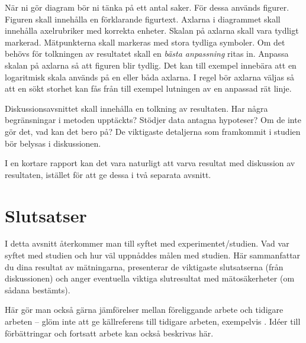 \documentclass[a4paper,nologo]{miunart} %
\begin{document}
När ni gör diagram bör ni tänka på ett antal saker.
För dessa används figurer.
Figuren skall innehålla en förklarande figurtext.
Axlarna i diagrammet skall innehålla axelrubriker med korrekta enheter.
Skalan på axlarna skall vara tydligt markerad.
Mätpunkterna skall markeras med stora tydliga symboler.
Om det behövs för tolkningen av resultatet skall en \emph{bästa anpassning}
ritas in.
Anpassa skalan på axlarna så att figuren blir tydlig.
Det kan till exempel innebära att en logaritmisk skala används på en eller båda 
axlarna.
I regel bör axlarna väljas så att en sökt storhet kan fås från till exempel 
lutningen av en anpassad rät linje.

Diskussionsavsnittet skall innehålla en tolkning av resultaten.
Har några begränsningar i metoden upptäckts?
Stödjer data antagna hypoteser?
Om de inte gör det, vad kan det bero på?
De viktigaste detaljerna som framkommit i studien bör belysas i diskussionen.

I en kortare rapport kan det vara naturligt att varva resultat med diskussion 
av resultaten, istället för att ge dessa i två separata avsnitt.


\section{Slutsatser}
\label{sec:conclusion}
\noindent
I detta avsnitt återkommer man till syftet med experimentet/studien.
Vad var syftet med studien och hur väl uppnåddes målen med studien.
Här sammanfattar du dina resultat av mätningarna, presenterar de viktigaste 
slutsatserna (från diskussionen) och anger eventuella viktiga slutresultat med 
mätosäkerheter (om sådana bestämts).

Här gör man också gärna jämförelser mellan föreliggande arbete och tidigare 
arbeten -- glöm inte att ge källreferens till tidigare arbeten, exempelvis 
\cite{Knuth1989arr}.
Idéer till förbättringar och fortsatt arbete kan också beskrivas här.



\end{document}
